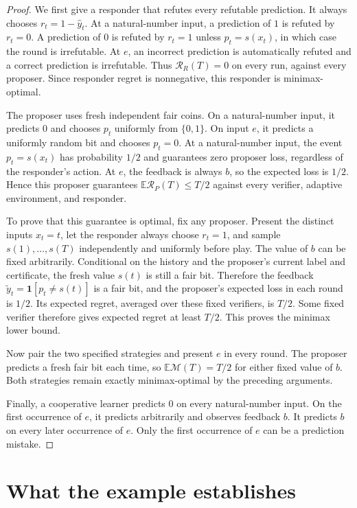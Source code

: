 \documentclass[11pt]{article}
\newcommand{\ind}{\mathbf 1}
\newcommand{\E}{\mathbb E}
\newcommand{\Reg}{\mathcal R}
\newcommand{\Mi}{\mathcal M}
\begin{document}
\begin{proof}
We first give a responder that refutes every refutable prediction. It
always chooses $r_t=1-\hat y_t$. At a natural-number input, a prediction
of $1$ is refuted by $r_t=0$. A prediction of $0$ is refuted by $r_t=1$
unless $p_t=s(x_t)$, in which case the round is irrefutable. At $e$, an
incorrect prediction is automatically refuted and a correct prediction is
irrefutable. Thus $\Reg_R(T)=0$ on every run, against every proposer.
Since responder regret is nonnegative, this responder is minimax-optimal.

The proposer uses fresh independent fair coins. On a natural-number
input, it predicts $0$ and chooses $p_t$ uniformly from $\{0,1\}$.
On input $e$, it predicts a uniformly random bit and chooses $p_t=0$.
At a natural-number input, the event $p_t=s(x_t)$ has probability $1/2$
and guarantees zero proposer loss, regardless of the responder's action.
At $e$, the feedback is always $b$, so the expected loss is $1/2$.
Hence this proposer guarantees $\E\Reg_P(T)\le T/2$ against every
verifier, adaptive environment, and responder.

To prove that this guarantee is optimal, fix any proposer. Present the
distinct inputs $x_t=t$, let the responder always choose $r_t=1$, and
sample $s(1),\ldots,s(T)$ independently and uniformly before play.
The value of $b$ can be fixed arbitrarily. Conditional on the history and
the proposer's current label and certificate, the fresh value $s(t)$ is
still a fair bit. Therefore the feedback
$\tilde y_t=\ind[p_t\ne s(t)]$ is a fair bit, and the proposer's expected
loss in each round is $1/2$. Its expected regret, averaged over these
fixed verifiers, is $T/2$. Some fixed verifier therefore gives expected
regret at least $T/2$. This proves the minimax lower bound.

Now pair the two specified strategies and present $e$ in every round.
The proposer predicts a fresh fair bit each time, so
$\E\Mi(T)=T/2$ for either fixed value of $b$. Both strategies remain
exactly minimax-optimal by the preceding arguments.

Finally, a cooperative learner predicts $0$ on every natural-number
input. On the first occurrence of $e$, it predicts arbitrarily and
observes feedback $b$. It predicts $b$ on every later occurrence of $e$.
Only the first occurrence of $e$ can be a prediction mistake.
\end{proof}

\section{What the example establishes}
\end{document}
